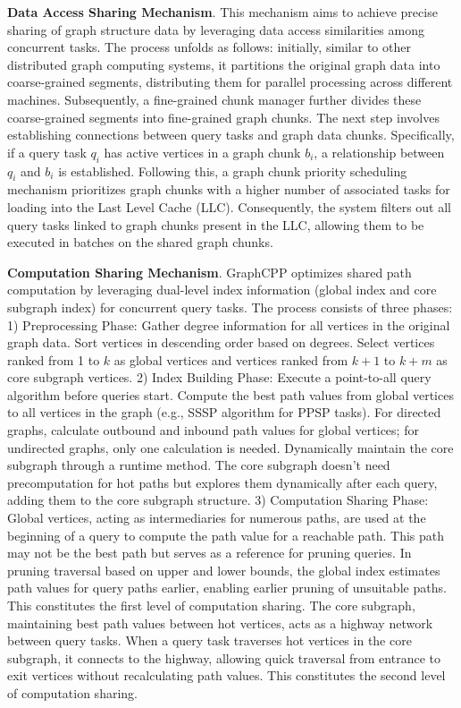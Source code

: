 \documentclass[lettersize,journal]{IEEEtran} %
\begin{document}
{\bf{Data Access Sharing Mechanism}}. This mechanism aims to achieve precise sharing of graph structure data by leveraging data access similarities among concurrent tasks. The process unfolds as follows: initially, similar to other distributed graph computing systems\cite{cgraph}\cite{multilyra}, it partitions the original graph data into coarse-grained segments, distributing them for parallel processing across different machines. Subsequently, a fine-grained chunk manager further divides these coarse-grained segments into fine-grained graph chunks. The next step involves establishing connections between query tasks and graph data chunks. Specifically, if a query task $q_i$ has active vertices in a graph chunk $b_i$, a relationship between $q_i$ and $b_i$ is established. Following this, a graph chunk priority scheduling mechanism prioritizes graph chunks with a higher number of associated tasks for loading into the Last Level Cache (LLC). Consequently, the system filters out all query tasks linked to graph chunks present in the LLC, allowing them to be executed in batches on the shared graph chunks.

{\bf{Computation Sharing Mechanism}}. GraphCPP optimizes shared path computation by leveraging dual-level index information (global index and core subgraph index) for concurrent query tasks. The process consists of three phases: 1) Preprocessing Phase: Gather degree information for all vertices in the original graph data. Sort vertices in descending order based on degrees. Select vertices ranked from 1 to $k$ as global vertices and vertices ranked from $k+1$ to $k+m$ as core subgraph vertices. 2) Index Building Phase: Execute a point-to-all query algorithm before queries start. Compute the best path values from global vertices to all vertices in the graph (e.g., SSSP algorithm for PPSP tasks). For directed graphs, calculate outbound and inbound path values for global vertices; for undirected graphs, only one calculation is needed. Dynamically maintain the core subgraph through a runtime method. The core subgraph doesn't need precomputation for hot paths but explores them dynamically after each query, adding them to the core subgraph structure. 3) Computation Sharing Phase: Global vertices, acting as intermediaries for numerous paths, are used at the beginning of a query to compute the path value for a reachable path. This path may not be the best path but serves as a reference for pruning queries. In pruning traversal based on upper and lower bounds, the global index estimates path values for query paths earlier, enabling earlier pruning of unsuitable paths. This constitutes the first level of computation sharing. The core subgraph, maintaining best path values between hot vertices, acts as a highway network between query tasks. When a query task traverses hot vertices in the core subgraph, it connects to the highway, allowing quick traversal from entrance to exit vertices without recalculating path values. This constitutes the second level of computation sharing.
\end{document}
